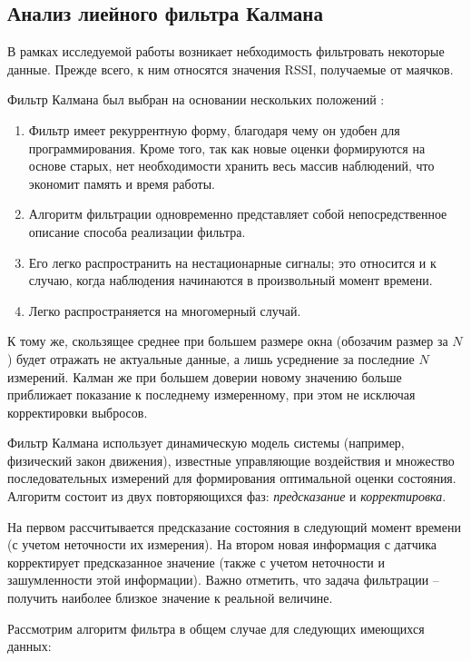 \subsection{Анализ лиейного фильтра Калмана}

В рамках исследуемой работы возникает небходимость фильтровать некоторые данные. Прежде всего, к ним относятся значения RSSI, получаемые от маячков.

Фильтр Калмана был выбран на основании нескольких положений \cite{eikhoff}:

\begin{enumerate}
    \item
    Фильтр имеет рекуррентную форму, благодаря чему он удобен для программирования. Кроме того, так как новые оценки формируются на основе старых, нет необходимости хранить весь массив наблюдений, что экономит память и время работы.
    \item
    Алгоритм фильтрации одновременно представляет собой непосредственное описание способа реализации фильтра.
    \item    
    Его легко распространить на нестационарные сигналы; это относится и к случаю, когда наблюдения начинаются в произвольный момент времени.
    \item
    Легко распространяется на многомерный случай.
\end{enumerate}

К тому же, скользящее среднее при большем размере окна (обозачим размер за $N$) будет отражать не актуальные данные, а лишь усреднение за последние $N$ измерений. Калман же при большем доверии новому значению больше приближает показание к последнему измеренному, при этом не исключая корректировки выбросов.

Фильтр Калмана использует динамическую модель системы (например, физический закон движения), известные управляющие воздействия и множество последовательных измерений для формирования оптимальной оценки состояния. Алгоритм состоит из двух повторяющихся фаз: \textit{предсказание} и \textit{корректировка}. 

На первом рассчитывается предсказание состояния в следующий момент времени (с учетом неточности их измерения). На втором новая информация с датчика корректирует предсказанное значение (также с учетом неточности и зашумленности этой информации). Важно отметить, что задача фильтрации – получить наиболее близкое значение к реальной величине.

Рассмотрим алгоритм фильтра в общем случае для следующих имеющихся данных: 

